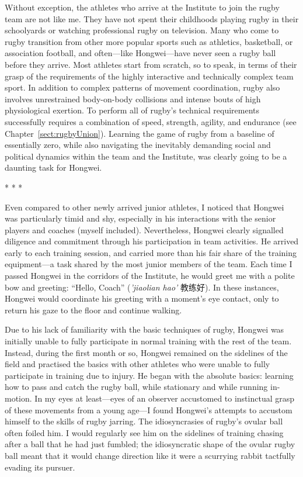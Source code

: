 \begin{CJK}{UTF8}{gbsn}
Without exception, the athletes who arrive at the Institute to join the rugby team are not like me. They have not spent their childhoods playing rugby in their schoolyards or watching professional rugby on television. Many who come to rugby transition from other more popular sports such as athletics, basketball, or association football, and often---like Hongwei---have never seen a rugby ball before they arrive.  Most athletes start from scratch, so to speak, in terms of their grasp of the requirements of the highly interactive and technically complex team sport.  In addition to complex patterns of movement coordination, rugby also involves unrestrained body-on-body collisions and intense bouts of high physiological exertion.  To perform all of rugby's technical requirements successfully requires a combination of speed, strength, agility, and endurance (see Chapter~\ref{sect:rugbyUnion}).  Learning the game of rugby from a baseline of essentially zero, while also navigating the inevitably demanding social and political dynamics within the team and the Institute, was clearly going to be a daunting task for Hongwei.


                        \begin{center}
                            * * *
                        \end{center}

Even compared to other newly arrived junior athletes, I noticed that Hongwei was particularly timid and shy, especially in his interactions with the senior players and coaches (myself included).  Nevertheless, Hongwei clearly signalled diligence and commitment through his participation in team activities.  He arrived early to each training session, and carried more than his fair share of the training equipment---a task shared by the most junior members of the team.  Each time I passed Hongwei in the corridors of the Institute, he would greet me with a polite bow and greeting: ``Hello, Coach'' (\textit{'jiaolian hao'} 教练好).  In these instances, Hongwei would coordinate his greeting with a moment's eye contact, only to return his gaze to the floor and continue walking.

Due to his lack of familiarity with the basic techniques of rugby, Hongwei was initially unable to fully participate in normal training with the rest of the team.  Instead, during the first month or so, Hongwei remained on the sidelines of the field and practised the basics with other athletes who were unable to fully participate in training due to injury. He began with the absolute basics: learning how to pass and catch the rugby ball, while stationary and while running in-motion. In my eyes at least---eyes of an observer accustomed to instinctual grasp of these movements from a young age---I found Hongwei's attempts to accustom himself to the skills of rugby jarring. The idiosyncrasies of rugby's ovular ball often foiled him.  I would regularly see him on the sidelines of training chasing after a ball that he had just fumbled; the idiosyncratic shape of the ovular rugby ball meant that it would change direction like it were a scurrying rabbit tactfully evading its pursuer.


\end{CJK}
